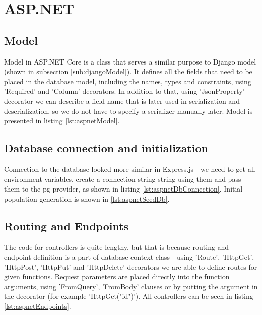 %
%
\section{ASP.NET}
\subsection{Model}
Model in ASP.NET Core is a class that serves a similar purpose to Django model (shown in subsection \ref{sub:djangoModel}). It defines all the fields that need to be placed in the database model, including the names, types and constraints, using 'Required' and 'Column' decorators. In addition to that, using 'JsonProperty' decorator we can describe a field name that is later used in serialization and deserialization, so we do not have to specify a serializer manually later. Model is presented in listing \ref{lst:aspnetModel}.


\subsection{Database connection and initialization}
Connection to the database looked more similar in Express.js - we need to get all environment variables, create a connection string string using them and pass them to the \acrlong{pg} provider, as shown in listing \ref{lst:aspnetDbConnection}. Initial population generation is shown in \ref{lst:aspnetSeedDb}.



\subsection{Routing and Endpoints}
The code for controllers is quite lengthy, but that is because routing and endpoint definition is a part of database context class - using 'Route', 'HttpGet', 'HttpPost', 'HttpPut' and 'HttpDelete' decorators we are able to define routes for given functions. Request parameters are placed directly into the function arguments, using 'FromQuery', 'FromBody' clauses or by putting the argument in the decorator (for example 'HttpGet("{id}")'). All controllers can be seen in listing \ref{lst:aspnetEndpoints}.



%
%
